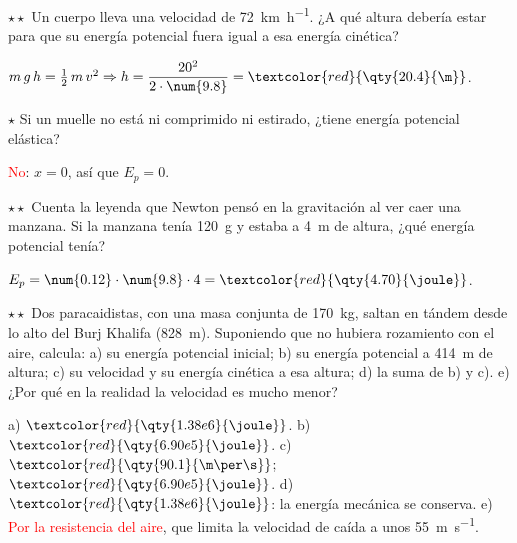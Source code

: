 \begin{exercise}
    \(\star\star\) Un cuerpo lleva una velocidad de \qty{72}{\km\per\hour}. ¿A qué altura debería estar para que su energía potencial
    fuera igual a esa energía cinética?
    \begin{solu}
        \(m\,g\,h = \frac{1}{2}\,m\,v^2 \Rightarrow h = \dfrac{20^2}{2 \cdot \num{9.8}} = \textcolor{red}{\qty{20.4}{\m}}\).
    \end{solu}
\end{exercise}

\begin{exercise}
    \(\star\) Si un muelle no está ni comprimido ni estirado, ¿tiene energía potencial elástica?
    \begin{solu}
        \textcolor{red}{No}: \(x = 0\), así que \(E_p = 0\).
    \end{solu}
\end{exercise}

\begin{exercise}
    \(\star\star\) Cuenta la leyenda que Newton pensó en la gravitación al ver caer una manzana. Si la manzana tenía \qty{120}{\g} y
    estaba a \qty{4}{\m} de altura, ¿qué energía potencial tenía?
    \begin{solu}
        \(E_p = \num{0.12} \cdot \num{9.8} \cdot 4 = \textcolor{red}{\qty{4.70}{\joule}}\).
    \end{solu}
\end{exercise}

\begin{exercise}
    \(\star\star\) Dos paracaidistas, con una masa conjunta de \qty{170}{\kg}, saltan en tándem desde lo alto del Burj Khalifa
    (\qty{828}{\m}). Suponiendo que no hubiera rozamiento con el aire, calcula: a) su energía potencial inicial; b) su energía potencial a
    \qty{414}{\m} de altura; c) su velocidad y su energía cinética a esa altura; d) la suma de b) y c). e) ¿Por qué en la realidad la
    velocidad es mucho menor?
    \begin{solu}
        a) \(\textcolor{red}{\qty{1.38e6}{\joule}}\). b) \(\textcolor{red}{\qty{6.90e5}{\joule}}\). c) \(\textcolor{red}{\qty{90.1}{\m\per\s}}\);
        \(\textcolor{red}{\qty{6.90e5}{\joule}}\). d) \(\textcolor{red}{\qty{1.38e6}{\joule}}\): la energía mecánica se conserva.
        e) \textcolor{red}{Por la resistencia del aire}, que limita la velocidad de caída a unos \qty{55}{\m\per\s}.
    \end{solu}
\end{exercise}

